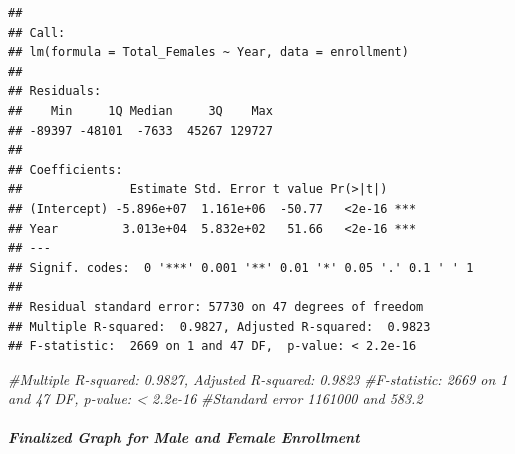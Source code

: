 \documentclass[]{article}
\newenvironment{Shaded}{\begin{snugshade}}{\end{snugshade}}
\newcommand{\CommentTok}[1]{\textcolor[rgb]{0.56,0.35,0.01}{\textit{#1}}}
\let\oldsubparagraph\subparagraph
\renewcommand{\subparagraph}[1]{\oldsubparagraph{#1}\mbox{}}
\begin{document}
\begin{verbatim}
## 
## Call:
## lm(formula = Total_Females ~ Year, data = enrollment)
## 
## Residuals:
##    Min     1Q Median     3Q    Max 
## -89397 -48101  -7633  45267 129727 
## 
## Coefficients:
##               Estimate Std. Error t value Pr(>|t|)    
## (Intercept) -5.896e+07  1.161e+06  -50.77   <2e-16 ***
## Year         3.013e+04  5.832e+02   51.66   <2e-16 ***
## ---
## Signif. codes:  0 '***' 0.001 '**' 0.01 '*' 0.05 '.' 0.1 ' ' 1
## 
## Residual standard error: 57730 on 47 degrees of freedom
## Multiple R-squared:  0.9827, Adjusted R-squared:  0.9823 
## F-statistic:  2669 on 1 and 47 DF,  p-value: < 2.2e-16
\end{verbatim}

\begin{Shaded}
\begin{Highlighting}[]
\CommentTok{#Multiple R-squared:  0.9827,   Adjusted R-squared:  0.9823 }
\CommentTok{#F-statistic:  2669 on 1 and 47 DF,  p-value: < 2.2e-16}
\CommentTok{#Standard error 1161000 and 583.2}
\end{Highlighting}
\end{Shaded}

\subparagraph{Finalized Graph for Male and Female
Enrollment}\label{finalized-graph-for-male-and-female-enrollment}
\end{document}
